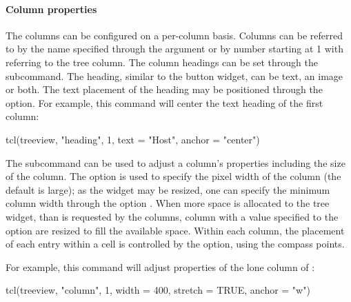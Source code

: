 \paragraph{Column properties}
The columns can be configured on a per-column basis. Columns can be
referred to by the name specified through the  argument
or by number starting at 1 with  referring to the tree
column. The column headings can be set through the
 subcommand. The heading, similar to
the button widget, can be text, an image or both. The text placement
of the heading may be positioned through the  option. For
example, this command will center the text heading of the first
column:
\begin{Schunk}
\begin{Sinput}
 tcl(treeview, "heading", 1, text = "Host", anchor = "center")
\end{Sinput}
\end{Schunk}

The  subcommand can be used to adjust
a column's properties including the size of the column. The option
 is used to specify the pixel width of the column (the
default is large); as the widget may be resized, one can specify the
minimum column width through the option . When more
space is allocated to the tree widget, than is requested by the
columns, column with a  value specified to the option
 are resized to fill the available space. Within each
column, the placement of each entry within a cell is controlled by the
 option, using the compass points.

For example, this command will adjust properties of the lone column of :
\begin{Schunk}
\begin{Sinput}
 tcl(treeview, "column", 1, width = 400,  
     stretch = TRUE, anchor = "w")
\end{Sinput}
\end{Schunk}


